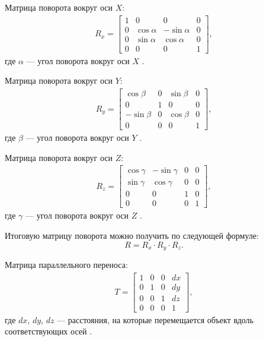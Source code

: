 Матрица поворота вокруг оси $X$:
\begin{equation}
\begin{gathered}
R_x = 
	\begin{bmatrix}
		1 & 0 & 0 & 0 \\
		0 & \cos{\alpha} & -\sin{\alpha} & 0 \\
		0 & \sin{\alpha} & \cos{\alpha} & 0 \\
		0 & 0 & 0 & 1
	\end{bmatrix},
\end{gathered}
\end{equation}
где $\alpha$  --- угол поворота вокруг оси $X$ \cite{Panov2017}.

Матрица поворота вокруг оси $Y$:
\begin{equation}
\begin{gathered}
R_y = 
	\begin{bmatrix}
		\cos{\beta} & 0 & \sin{\beta} & 0 \\
		0 & 1 & 0 & 0 \\
		-\sin{\beta} & 0 & \cos{\beta} & 0 \\
		0 & 0 & 0 & 1
	\end{bmatrix},
\end{gathered}
\end{equation}
где $\beta$  --- угол поворота вокруг оси $Y$ \cite{Panov2017}.

Матрица поворота вокруг оси $Z$:
\begin{equation}
\begin{gathered}
R_z = 
	\begin{bmatrix}
		\cos{\gamma} & -\sin{\gamma} & 0 & 0 \\
		\sin{\gamma} & \cos{\gamma} & 0 & 0 \\
		0 & 0 & 1 & 0 \\
		0 & 0 & 0 & 1
	\end{bmatrix},
\end{gathered}
\end{equation}
где $\gamma$  --- угол поворота вокруг оси $Z$ \cite{Panov2017}.

Итоговую матрицу поворота можно получить по следующей формуле:
\begin{equation}
R = R_x \cdot R_y \cdot R_z.
\end{equation}

Матрица параллельного переноса:
\begin{equation}
\begin{gathered}
T = 
	\begin{bmatrix}
		1 & 0 & 0 & dx \\
		0 & 1 & 0 & dy \\
		0 & 0 & 1 & dz \\
		0 & 0 & 0 & 1
	\end{bmatrix},
\end{gathered}
\end{equation}
где $dx$, $dy$, $dz$ --- расстояния, на которые перемещается объект вдоль соответствующих осей \cite{Panov2017}.

